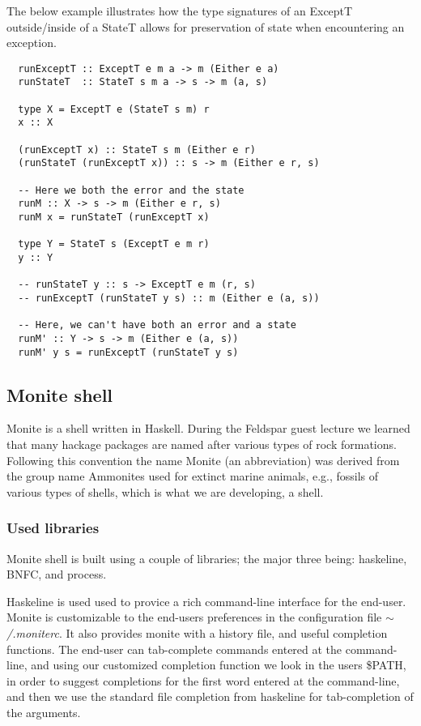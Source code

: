 \documentclass[11pt,a4paper]{article}
\begin{document}
The below example illustrates how the type signatures of an ExceptT
outside/inside of a StateT allows for preservation of state when encountering
an exception.

\begin{verbatim}
  runExceptT :: ExceptT e m a -> m (Either e a)
  runStateT  :: StateT s m a -> s -> m (a, s)

  type X = ExceptT e (StateT s m) r
  x :: X

  (runExceptT x) :: StateT s m (Either e r)
  (runStateT (runExceptT x)) :: s -> m (Either e r, s)

  -- Here we both the error and the state
  runM :: X -> s -> m (Either e r, s)
  runM x = runStateT (runExceptT x)

  type Y = StateT s (ExceptT e m r)
  y :: Y

  -- runStateT y :: s -> ExceptT e m (r, s)
  -- runExceptT (runStateT y s) :: m (Either e (a, s))

  -- Here, we can't have both an error and a state
  runM' :: Y -> s -> m (Either e (a, s))
  runM' y s = runExceptT (runStateT y s)
\end{verbatim}

\subsection{Monite shell}
\label{monite}

Monite is a shell written in Haskell. During the Feldspar guest lecture we
learned that many hackage packages are named after various types of rock
formations. Following this convention the name Monite (an abbreviation) was
derived from the group name Ammonites used for extinct marine animals, e.g.,
fossils of various types of shells, which is what we are developing, a shell.

\subsubsection{Used libraries}

Monite shell is built using a couple
of libraries; the major three being: haskeline, BNFC, and process.

Haskeline is used used to provice a rich command-line interface for the
end-user. Monite is customizable to the end-users preferences in the
configuration file $\mathtt{\sim}$\textit{/.moniterc}. It also provides monite
with a history file, and useful completion functions. The end-user can
tab-complete commands entered at the command-line, and using our customized
completion function we look in the users \$PATH, in order to suggest completions
for the first word entered at the command-line, and then we use the standard
file completion from haskeline for tab-completion of the arguments.
\end{document}
